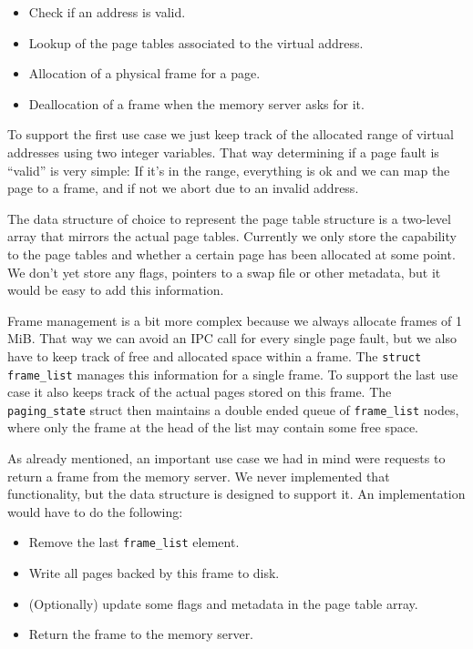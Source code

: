 \documentclass[a4paper,10pt]{article}
\begin{document}
\begin{itemize}
 \item Check if an address is valid.
 \item Lookup of the page tables associated to the virtual address.
 \item Allocation of a physical frame for a page.
 \item Deallocation of a frame when the memory server asks for it.
\end{itemize}

To support the first use case we just keep track of the allocated range of virtual addresses using two integer variables.
That way determining if a page fault is ``valid'' is very simple: 
If it's in the range, everything is ok and we can map the page to a frame, and if not we abort due to an invalid address.

The data structure of choice to represent the page table structure is a two-level array that mirrors the actual page tables.
Currently we only store the capability to the page tables and whether a certain page has been allocated at some point.
We don't yet store any flags, pointers to a swap file or other metadata, but it would be easy to add this information.

Frame management is a bit more complex because we always allocate frames of 1 MiB.
That way we can avoid an IPC call for every single page fault, but we also have to keep track of free and allocated space within a frame.
The \lstinline!struct frame_list! manages this information for a single frame.
To support the last use case it also keeps track of the actual pages stored on this frame.
The \lstinline!paging_state! struct then maintains a double ended queue of \lstinline!frame_list! nodes, where only the frame at the head of the list may contain some free space.

As already mentioned, an important use case we had in mind were requests to return a frame from the memory server.
We never implemented that functionality, but the data structure is designed to support it.
An implementation would have to do the following:
\begin{itemize}
 \item Remove the last \lstinline!frame_list! element.
 \item Write all pages backed by this frame to disk.
 \item (Optionally) update some flags and metadata in the page table array.
 \item Return the frame to the memory server.
\end{itemize}
\end{document}
